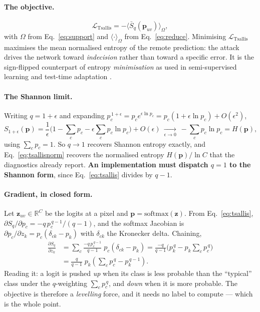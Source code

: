 \documentclass[11pt,a4paper]{article}
\begin{document}
\paragraph{The objective.}
\begin{equation}
  \mathcal{L}_{\mathrm{Tsallis}}
  = -\big\langle \bar S_q(\mathbf{p}_{uv})\big\rangle_\Omega ,
  \label{eq:tsallisloss}
\end{equation}
with $\Omega$ from Eq.~\eqref{eq:support} and $\langle\cdot\rangle_\Omega$
from Eq.~\eqref{eq:reduce}. Minimising $\mathcal{L}_{\mathrm{Tsallis}}$
maximises the mean normalised entropy of the remote prediction: the attack
drives the network toward \emph{indecision} rather than toward a specific
error. It is the sign-flipped counterpart of entropy \emph{minimisation} as
used in semi-supervised learning and test-time adaptation
\citep{grandvalet2004,wang2021tent}.

\paragraph{The Shannon limit.}
Writing $q=1+\epsilon$ and expanding $p_c^{\,1+\epsilon}
= p_c e^{\epsilon\ln p_c} = p_c(1+\epsilon\ln p_c) + O(\epsilon^2)$,
\begin{equation}
  S_{1+\epsilon}(\mathbf{p})
  = \frac{1}{\epsilon}\Big(1-\sum_c p_c-\epsilon\sum_c p_c\ln p_c\Big)
    + O(\epsilon)
  \ \xrightarrow[\epsilon\to0]{}\ -\sum_c p_c\ln p_c
  = H(\mathbf{p}),
  \label{eq:shannonlimit}
\end{equation}
using $\sum_c p_c=1$. So $q\to1$ recovers Shannon entropy exactly, and
Eq.~\eqref{eq:tsallisnorm} recovers the normalised entropy
$H(\mathbf{p})/\ln C$ that the diagnostics already report. \textbf{An
implementation must dispatch $q=1$ to the Shannon form}, since
Eq.~\eqref{eq:tsallis} divides by $q-1$.

\paragraph{Gradient, in closed form.}
Let $\mathbf{z}_{uv}\in\mathbb{R}^C$ be the logits at a pixel and
$\mathbf{p}=\mathrm{softmax}(\mathbf{z})$. From Eq.~\eqref{eq:tsallis},
$\partial S_q/\partial p_c = -q\,p_c^{\,q-1}/(q-1)$, and the softmax
Jacobian is $\partial p_c/\partial z_k = p_c(\delta_{ck}-p_k)$ with
$\delta_{ck}$ the Kronecker delta. Chaining,
\begin{align}
  \frac{\partial S_q}{\partial z_k}
  &= \sum_{c}\frac{-q\,p_c^{\,q-1}}{q-1}\;p_c(\delta_{ck}-p_k)
   = \frac{-q}{q-1}\Big(p_k^{\,q} - p_k\sum_c p_c^{\,q}\Big)
  \nonumber\\
  &= \frac{q}{q-1}\;p_k\left(\sum_{c}p_c^{\,q} - p_k^{\,q-1}\right).
  \label{eq:tsallisgrad}
\end{align}
Reading it: a logit is pushed \emph{up} when its class is less probable than
the ``typical'' class under the $q$-weighting $\sum_c p_c^{\,q}$, and
\emph{down} when it is more probable. The objective is therefore a
\emph{levelling} force, and it needs no label to compute --- which is the
whole point.
\end{document}
